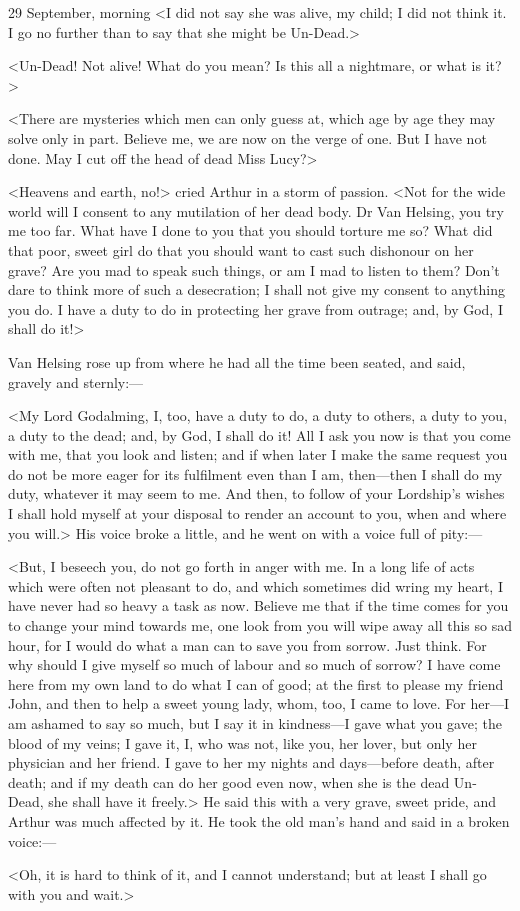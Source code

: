\begin{diary}{29 September, morning}
<I did not say she was alive, my child; I did not think it. I go no further than to say that she might be Un-Dead.>

<Un-Dead! Not alive! What do you mean? Is this all a nightmare, or what is it?>

<There are mysteries which men can only guess at, which age by age they may solve only in part. Believe me, we are now on the verge of one. But I have not done. May I cut off the head of dead Miss Lucy?>

<Heavens and earth, no!> cried Arthur in a storm of passion. <Not for the wide world will I consent to any mutilation of her dead body. Dr Van Helsing, you try me too far. What have I done to you that you should torture me so? What did that poor, sweet girl do that you should want to cast such dishonour on her grave? Are you mad to speak such things, or am I mad to listen to them? Don't dare to think more of such a desecration; I shall not give my consent to anything you do. I have a duty to do in protecting her grave from outrage; and, by God, I shall do it!>

Van Helsing rose up from where he had all the time been seated, and said, gravely and sternly:—

<My Lord Godalming, I, too, have a duty to do, a duty to others, a duty to you, a duty to the dead; and, by God, I shall do it! All I ask you now is that you come with me, that you look and listen; and if when later I make the same request you do not be more eager for its fulfilment even than I am, then—then I shall do my duty, whatever it may seem to me. And then, to follow of your Lordship's wishes I shall hold myself at your disposal to render an account to you, when and where you will.> His voice broke a little, and he went on with a voice full of pity:—

<But, I beseech you, do not go forth in anger with me. In a long life of acts which were often not pleasant to do, and which sometimes did wring my heart, I have never had so heavy a task as now. Believe me that if the time comes for you to change your mind towards me, one look from you will wipe away all this so sad hour, for I would do what a man can to save you from sorrow. Just think. For why should I give myself so much of labour and so much of sorrow? I have come here from my own land to do what I can of good; at the first to please my friend John, and then to help a sweet young lady, whom, too, I came to love. For her—I am ashamed to say so much, but I say it in kindness—I gave what you gave; the blood of my veins; I gave it, I, who was not, like you, her lover, but only her physician and her friend. I gave to her my nights and days—before death, after death; and if my death can do her good even now, when she is the dead Un-Dead, she shall have it freely.> He said this with a very grave, sweet pride, and Arthur was much affected by it. He took the old man's hand and said in a broken voice:—

<Oh, it is hard to think of it, and I cannot understand; but at least I shall go with you and wait.>
\end{diary}